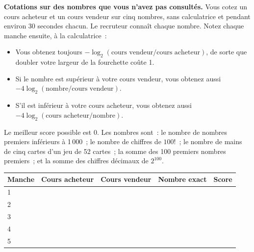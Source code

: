 \begin{question}\label{iq:iv2:played-games:5}
\textbf{Cotations sur des nombres que vous n'avez pas consultés.} Vous cotez un cours acheteur et un cours vendeur sur cinq nombres, sans calculatrice et pendant environ 30 secondes chacun. Le recruteur connaît chaque nombre. Notez chaque manche ensuite, à la calculatrice~:
\begin{itemize}
\item Vous obtenez toujours $-\log_2(\text{cours vendeur}/\text{cours acheteur})$, de sorte que doubler votre largeur de la fourchette coûte 1.
\item Si le nombre est supérieur à votre cours vendeur, vous obtenez aussi $-4\log_2(\text{nombre}/\text{cours vendeur})$.
\item S'il est inférieur à votre cours acheteur, vous obtenez aussi $-4\log_2(\text{cours acheteur}/\text{nombre})$.
\end{itemize}
Le meilleur score possible est 0. Les nombres sont~: le nombre de nombres premiers inférieurs à 1\,000~; le nombre de chiffres de $100!$~; le nombre de mains de cinq cartes d'un jeu de 52 cartes~; la somme des 100 premiers nombres premiers~; et la somme des chiffres décimaux de $2^{100}$.

\medskip
\begin{tabular}{@{}l|l|l|l|l@{}}
Manche & Cours acheteur & Cours vendeur & Nombre exact & Score \\ \hline
1 & & & & \\[8pt]\hline
2 & & & & \\[8pt]\hline
3 & & & & \\[8pt]\hline
4 & & & & \\[8pt]\hline
5 & & & & \\[8pt]\hline
\end{tabular}
\end{question}
\vfill\clearpage

